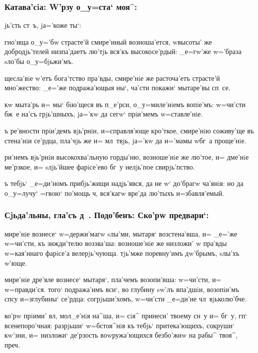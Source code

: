 \documentclass[12pt,a5paper,dvips,civil=antiqua]{hipbook}
\begin{document}
\subsubsection{Катава'сiа: W'рзу о_у=ста` моя^: }

 jь'сть ст~ъ, jа='коже ты`:

 гно'ища о_у='бw страсте'й смире'нный возноша'ется, w\т высоты' же
добродjь'телей низпа'даетъ лю'тjь вся'къ высокосе'рдый: _е=гw'же
w='браза sло'бы о_у=бjьжи'мъ.

щесла'вiе w'етъ бога'тство пра'вды, смире'нiе же
расточа'етъ страсте'й мно'жество: _е='же подража'ющыя ны`, ча'сти
покажи` мытаре'вы сп~се.

кw мыта'рь и= мы` бiю'щеся въ п_е'рси, о_у=миле'нiемъ
вопiе'мъ: w=чи'сти бж~е на'съ грjь'шныхъ, jа='кw да сегw` прiи'мемъ
w=ставле'нiе.

ъ ре'вности прiи'демъ вjь'рнiн, и=справля'юще кро'ткое,
смире'нiю соживу'ще въ стена'нiи се'рдца, пла'чjь же и= мл~твjь,
jа='кw да и='мамы w\т бг~а проще'нiе.

 ри'немъ вjь'рнiи высокохва'льную горды'ню,
возноше'нiе же лю'тое, и= дме'нiе ме'рзкое, и= sлjь'йшее фарiсе'ево
бг~у нелjь'пое свирjь'пство.

 ъ тебjь` _е=ди'номъ прибjь'жищи
надjь'явся, да не w` до'брагw ча'янiя: но да о_у=лучу` =гвою`
по'мощь ч, вся'кагw вре'да лю'тыхъ и=збавля'емый.

\subsubsection{Сjьда'льны, гла'съ д~. Подо'бенъ: Ско'рw предвари`:}

мире'нiе вознесе` w=держи'магw sлы'ми, мытаря` возстена'вша, и=
_е='же w=чи'сти, къ зижди'телю воззва'ша: возноше'нiе же низложи' w\т
пра'вды w=кая'ннаго фарiсе'а велерjь'чующа. тjь'мже поревну'имъ
дw'брымъ, sлы'хъ w'юще.

 мире'нiе дре'вле вознесе` мытаря`, пла'чемъ
возопи'вша: w=чи'сти, и= w=правди'ся. того` подража'имъ вси`, во
глубину sw'лъ впа'дшiи, возопiи'мъ спсу и=з\ъ глубины` се'рдца:
согрjьши'хомъ, w=чи'сти _е=ди'не чл~вjьколю'бче.

 ко'рw прiими' вл,
мол_е'нiя на^ша, и= сiя^ принеси' твоему сн~у и= бг~у, гп`
всенепоро'чная: разрjьши` w=бстоя^нiя къ тебjь` притека'ющихъ,
сокруши` кw'зни, и= низложи` де'рзость воwружа'ющихся безбо'жнw на
рабы^ твоя^, преч.
\end{document}
